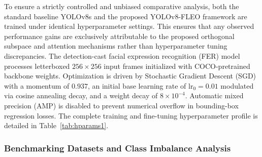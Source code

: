 \documentclass[algorithms,article,submit,moreauthors]{Definitions/mdpi}
\newcommand{\rev}[1]{\textcolor{revcolor}{#1}}
\begin{document}
To ensure a strictly controlled and unbiased comparative analysis, both the standard baseline YOLOv8s and the proposed YOLOv8-FLEO framework are trained under identical hyperparameter settings. This ensures that any observed performance gains are exclusively attributable to the proposed orthogonal subspace and attention mechanisms rather than hyperparameter tuning discrepancies. The detection-cast facial expression recognition (FER) model processes letterboxed $256\times256$ input frames initialized with COCO-pretrained backbone weights. Optimization is driven by Stochastic Gradient Descent (SGD) with a momentum of $0.937$, an initial base learning rate of $\mathrm{lr_0}=0.01$ modulated via cosine annealing decay, and a weight decay of $8\times10^{-4}$. Automatic mixed precision (AMP) is disabled to prevent numerical overflow in bounding-box regression losses. The complete training and fine-tuning hyperparameter profile is detailed in Table~\ref{tab:hparams1}.

\begin{table}[h!]
\centering
\caption{\rev{
Training and optimization hyperparameters used for the baseline and FLEO.}}
\label{tab:hparams1}
\end{table}

\subsubsection{Benchmarking Datasets and Class Imbalance Analysis}
\end{document}
